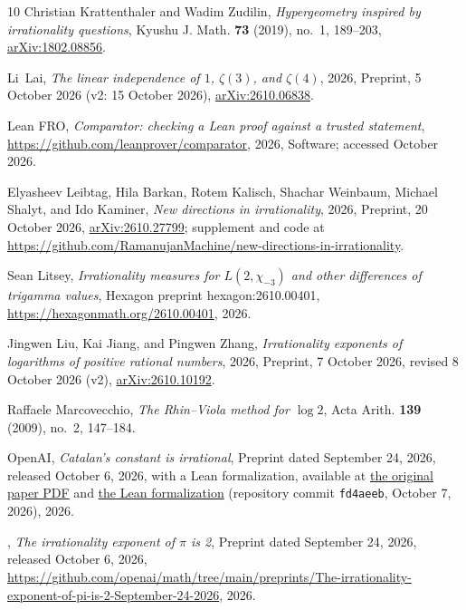 \documentclass[11pt]{amsart}
\theoremstyle{definition}
\theoremstyle{remark}
\numberwithin{equation}{section}
\begin{document}
\begin{thebibliography}{10}
Christian Krattenthaler and Wadim Zudilin, \emph{Hypergeometry inspired by
  irrationality questions}, Kyushu J. Math. \textbf{73} (2019), no.~1,
  189--203, \href{https://arxiv.org/abs/1802.08856}{arXiv:1802.08856}.

Li~Lai, \emph{The linear independence of {$1$}, {$\zeta(3)$}, and
  {$\zeta(4)$}}, 2026, Preprint, 5 October 2026 (v2: 15 October 2026),
  \href{https://arxiv.org/abs/2610.06838}{arXiv:2610.06838}.

{Lean FRO}, \emph{Comparator: checking a {L}ean proof against a trusted
  statement}, \url{https://github.com/leanprover/comparator}, 2026, Software;
  accessed October 2026.

Elyasheev Leibtag, Hila Barkan, Rotem Kalisch, Shachar Weinbaum, Michael
  Shalyt, and Ido Kaminer, \emph{New directions in irrationality}, 2026,
  Preprint, 20 October 2026,
  \href{https://arxiv.org/abs/2610.27799}{arXiv:2610.27799}; supplement and
  code at
  \url{https://github.com/RamanujanMachine/new-directions-in-irrationality}.

Sean Litsey, \emph{Irrationality measures for {$L(2,\chi_{-3})$} and other
  differences of trigamma values}, Hexagon preprint hexagon:2610.00401,
  \url{https://hexagonmath.org/2610.00401}, 2026.

Jingwen Liu, Kai Jiang, and Pingwen Zhang, \emph{Irrationality exponents of
  logarithms of positive rational numbers}, 2026, Preprint, 7 October 2026,
  revised 8 October 2026 (v2),
  \href{https://arxiv.org/abs/2610.10192}{arXiv:2610.10192}.

Raffaele Marcovecchio, \emph{The {R}hin--{V}iola method for {$\log 2$}}, Acta
  Arith. \textbf{139} (2009), no.~2, 147--184.

{OpenAI}, \emph{Catalan's constant is irrational}, Preprint dated September 24,
  2026, released October 6, 2026, with a Lean formalization, available at
  \href{https://github.com/openai/math/blob/fd4aeeb2ee4fc729c18d98444fed42fd0529eeeb/preprints/Catalans-constant-is-irrational-September-24-2026/paper.pdf}{the
  original paper PDF} and
  \href{https://github.com/openai/math/tree/fd4aeeb2ee4fc729c18d98444fed42fd0529eeeb/lean/OAI/NumberTheory/Catalan}{the
  Lean formalization} (repository commit \texttt{fd4aeeb}, October 7, 2026),
  2026.

\bysame, \emph{The irrationality exponent of {$\pi$} is 2}, Preprint dated
  September 24, 2026, released October 6, 2026,
  \url{https://github.com/openai/math/tree/main/preprints/The-irrationality-exponent-of-pi-is-2-September-24-2026},
  2026.


\end{thebibliography}
\end{document}
